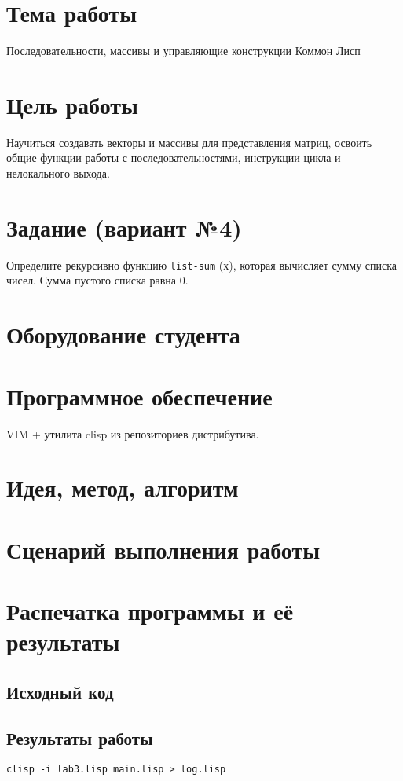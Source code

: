 \documentclass[12pt]{article}
\begin{document}

\section{Тема работы}
Последовательности, массивы и управляющие конструкции Коммон Лисп

\section{Цель работы}
Научиться создавать векторы и массивы для представления матриц,
освоить общие функции работы с последовательностями,
инструкции цикла и нелокального выхода.

\section{Задание (вариант №4)}
\noindent
Определите рекурсивно функцию {\tt list-sum} (х), которая вычисляет сумму
списка чисел.
Сумма пустого списка равна 0.

\section{Оборудование студента}
\mypc

\section{Программное обеспечение}
VIM + утилита clisp из репозиториев дистрибутива.

\section{Идея, метод, алгоритм}
\section{Сценарий выполнения работы}
\section{Распечатка программы и её результаты}

\subsection{Исходный код}

\subsection{Результаты работы}
\lstinline{clisp -i lab3.lisp main.lisp > log.lisp}
\end{document}
